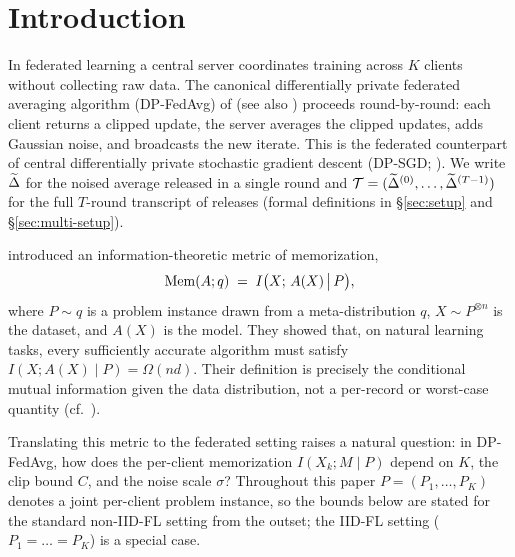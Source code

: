 \section{Introduction}\label{sec:intro}

In federated learning a central server coordinates training across \(K\) clients without collecting raw data. The canonical differentially private federated averaging algorithm (DP-FedAvg) of \citet{McMahan2018DPFedAvg} (see also \citealt{Geyer2017DPFedAvg}) proceeds round-by-round: each client returns a clipped update, the server averages the clipped updates, adds Gaussian noise, and broadcasts the new iterate. This is the federated counterpart of central differentially private stochastic gradient descent (DP-SGD; \citealt{Abadi2016DPSGD,DworkRoth2014Foundations}). We write \(\widetilde{\Delta}\) for the noised average released in a single round and \(\mathcal{T}=(\widetilde{\Delta}^{(0)},\dots,\widetilde{\Delta}^{(T-1)})\) for the full \(T\)-round transcript of releases (formal definitions in \S\ref{sec:setup} and \S\ref{sec:multi-setup}).

\citet{Brown2021Memorization} introduced an information-theoretic metric of memorization,
\[
\mathrm{Mem}(A;q)\;=\;I\bigl(X;\,A(X)\,\big|\,P\bigr),
\]
where \(P\sim q\) is a problem instance drawn from a meta-distribution \(q\), \(X\sim P^{\otimes n}\) is the dataset, and \(A(X)\) is the model. They showed that, on natural learning tasks, every sufficiently accurate algorithm must satisfy \(I(X;A(X)\mid P)=\Omega(nd)\). Their definition is precisely the conditional mutual information given the data distribution, not a per-record or worst-case quantity (cf.\ \citealp[Theorem~1.1, Section~1.1]{Brown2021Memorization}).

Translating this metric to the federated setting raises a natural question: in DP-FedAvg, how does the per-client memorization \(I(X_k; M\mid P)\) depend on \(K\), the clip bound \(C\), and the noise scale \(\sigma\)? Throughout this paper \(P=(P_1,\dots,P_K)\) denotes a joint per-client problem instance, so the bounds below are stated for the standard non-IID-FL setting from the outset; the IID-FL setting (\(P_1=\dots=P_K\)) is a special case.

